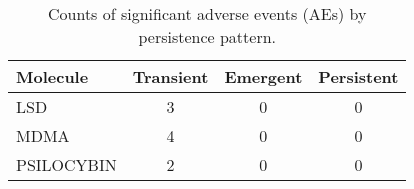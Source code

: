 \begin{table}[htbp]
  \centering
  \caption{Counts of significant adverse events (AEs) by persistence pattern.}
  \label{tab:forest-ae-sig-counts}
  \begin{tabular}{lccc}
    \toprule
    Molecule & Transient & Emergent & Persistent \\
    \midrule
    LSD & 3 & 0 & 0 \\
    MDMA & 4 & 0 & 0 \\
    PSILOCYBIN & 2 & 0 & 0 \\
    \bottomrule
  \end{tabular}
\end{table}
